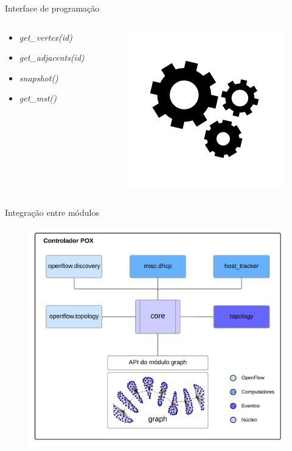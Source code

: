 \begin{frame}{Interface de programação}

    \begin{columns}[T] %
        \begin{column}{.33\textwidth}

            \begin{itemize}
                \setlength{\itemsep}{.5cm}
                \item \emph{get\_vertex(id)}
                \item \emph{get\_adjacents(id)}
                \item \emph{snapshot()}
                \item \emph{get\_mst()}
            \end{itemize}
        \end{column}%
        \hfill%
        \begin{column}{.67\textwidth}
            \begin{figure}[h]
                \centering
                \includegraphics[scale=4]{images/gear}
            \end{figure}
        \end{column}%
    \end{columns}

\end{frame}

\begin{frame}{Integração entre módulos}

\begin{figure}[h!]
    \centering
    \includegraphics[scale=.55]{images/graph-module-integration}
\end{figure}

\end{frame}
